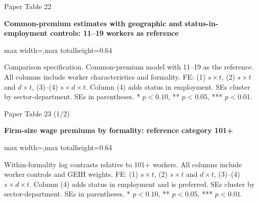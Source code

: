 \begin{frame}{Paper Table 22}
\begin{minipage}{\textwidth}\small\textbf{Common-premium estimates with geographic and status-in-employment controls: 11--19 workers as reference}\end{minipage}\par\vspace{0.15cm}
\centering\begingroup\fontsize{8.5}{10}\selectfont
\setlength{\tabcolsep}{4pt}\renewcommand{\arraystretch}{1.06}
\begin{adjustbox}{max width=\textwidth,max totalheight=0.64\textheight}

\end{adjustbox}\endgroup\par\vspace{0.10cm}
{\fontsize{6.5}{7.5}\selectfont\raggedright Comparison specification. Common-premium model with 11--19 as the reference. All columns include worker characteristics and formality. FE: (1) $s\times t$, (2) $s\times t$ and $d\times t$, (3)--(4) $s\times d\times t$. Column (4) adds status in employment. SEs cluster by sector-department. SEs in parentheses. * $p<0.10$, ** $p<0.05$, *** $p<0.01$.\par}
\end{frame}

\begin{frame}{Paper Table 23 (1/2)}
\begin{minipage}{\textwidth}\small\textbf{Firm-size wage premiums by formality: reference category 101+}\end{minipage}\par\vspace{0.15cm}
\centering\begingroup\fontsize{8.5}{10}\selectfont
\setlength{\tabcolsep}{4pt}\renewcommand{\arraystretch}{1.06}
\begin{adjustbox}{max width=\textwidth,max totalheight=0.64\textheight}

\end{adjustbox}\endgroup\par\vspace{0.10cm}
{\fontsize{6.5}{7.5}\selectfont\raggedright Within-formality log contrasts relative to 101+ workers. All columns include worker controls and GEIH weights. FE: (1) $s\times t$, (2) $s\times t$ and $d\times t$, (3)--(4) $s\times d\times t$. Column (4) adds status in employment and is preferred. SEs cluster by sector-department. SEs in parentheses. * $p<0.10$, ** $p<0.05$, *** $p<0.01$.\par}
\end{frame}

